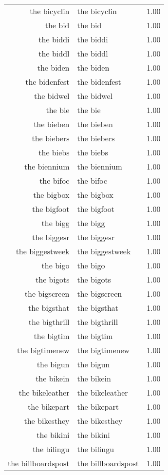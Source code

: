 \begin{table}[ht]
\begin{tabular}{rlr}
  the bicyclin & the bicyclin & 1.00 \\ 
  the bid & the bid & 1.00 \\ 
  the biddi & the biddi & 1.00 \\ 
  the biddl & the biddl & 1.00 \\ 
  the biden & the biden & 1.00 \\ 
  the bidenfest & the bidenfest & 1.00 \\ 
  the bidwel & the bidwel & 1.00 \\ 
  the bie & the bie & 1.00 \\ 
  the bieben & the bieben & 1.00 \\ 
  the biebers & the biebers & 1.00 \\ 
  the biebs & the biebs & 1.00 \\ 
  the biennium & the biennium & 1.00 \\ 
  the bifoc & the bifoc & 1.00 \\ 
  the bigbox & the bigbox & 1.00 \\ 
  the bigfoot & the bigfoot & 1.00 \\ 
  the bigg & the bigg & 1.00 \\ 
  the biggesr & the biggesr & 1.00 \\ 
  the biggestweek & the biggestweek & 1.00 \\ 
  the bigo & the bigo & 1.00 \\ 
  the bigots & the bigots & 1.00 \\ 
  the bigscreen & the bigscreen & 1.00 \\ 
  the bigsthat & the bigsthat & 1.00 \\ 
  the bigthrill & the bigthrill & 1.00 \\ 
  the bigtim & the bigtim & 1.00 \\ 
  the bigtimenew & the bigtimenew & 1.00 \\ 
  the bigun & the bigun & 1.00 \\ 
  the bikein & the bikein & 1.00 \\ 
  the bikeleather & the bikeleather & 1.00 \\ 
  the bikepart & the bikepart & 1.00 \\ 
  the bikesthey & the bikesthey & 1.00 \\ 
  the bikini & the bikini & 1.00 \\ 
  the bilingu & the bilingu & 1.00 \\ 
  the billboardspost & the billboardspost & 1.00 \\ 

\end{tabular}
\end{table}
